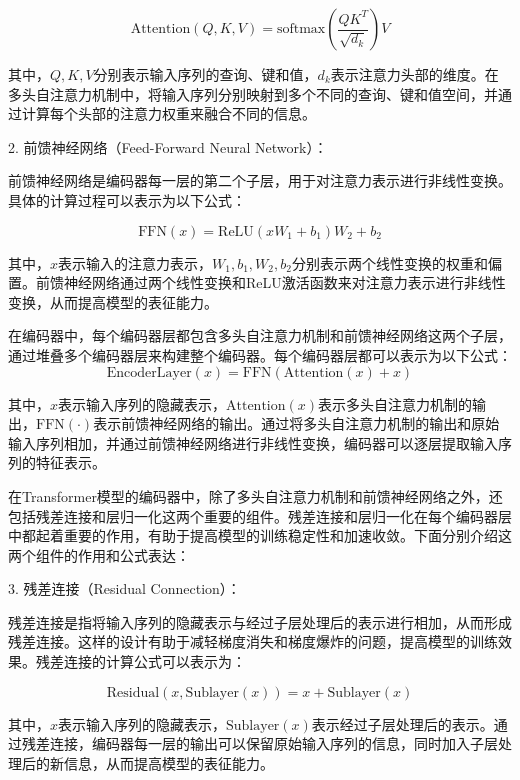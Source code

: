 \begin{equation}
	\text{Attention}(Q, K, V) = \text{softmax}\left(\frac{QK^T}{\sqrt{d_k}}\right)V
\end{equation}

其中，$Q, K, V$分别表示输入序列的查询、键和值，$d_k$表示注意力头部的维度。在多头自注意力机制中，将输入序列分别映射到多个不同的查询、键和值空间，并通过计算每个头部的注意力权重来融合不同的信息。

2. 前馈神经网络（Feed-Forward Neural Network）：

前馈神经网络是编码器每一层的第二个子层，用于对注意力表示进行非线性变换。具体的计算过程可以表示为以下公式：

\begin{equation}
	\text{FFN}(x) = \text{ReLU}(xW_1 + b_1)W_2 + b_2
\end{equation}


其中，$x$表示输入的注意力表示，$W_1, b_1, W_2, b_2$分别表示两个线性变换的权重和偏置。前馈神经网络通过两个线性变换和ReLU激活函数来对注意力表示进行非线性变换，从而提高模型的表征能力。

在编码器中，每个编码器层都包含多头自注意力机制和前馈神经网络这两个子层，通过堆叠多个编码器层来构建整个编码器。每个编码器层都可以表示为以下公式：
\begin{equation}
	\text{EncoderLayer}(x) = \text{FFN}(\text{Attention}(x) + x)
\end{equation}

其中，$x$表示输入序列的隐藏表示，$\text{Attention}(x)$表示多头自注意力机制的输出，$\text{FFN}(\cdot)$表示前馈神经网络的输出。通过将多头自注意力机制的输出和原始输入序列相加，并通过前馈神经网络进行非线性变换，编码器可以逐层提取输入序列的特征表示。

在Transformer模型的编码器中，除了多头自注意力机制和前馈神经网络之外，还包括残差连接和层归一化这两个重要的组件。残差连接和层归一化在每个编码器层中都起着重要的作用，有助于提高模型的训练稳定性和加速收敛。下面分别介绍这两个组件的作用和公式表达：


3. 残差连接（Residual Connection）：

残差连接是指将输入序列的隐藏表示与经过子层处理后的表示进行相加，从而形成残差连接。这样的设计有助于减轻梯度消失和梯度爆炸的问题，提高模型的训练效果。残差连接的计算公式可以表示为：

\begin{equation}
	\text{Residual}(x, \text{Sublayer}(x)) = x + \text{Sublayer}(x)
\end{equation}


其中，$x$表示输入序列的隐藏表示，$\text{Sublayer}(x)$表示经过子层处理后的表示。通过残差连接，编码器每一层的输出可以保留原始输入序列的信息，同时加入子层处理后的新信息，从而提高模型的表征能力。

